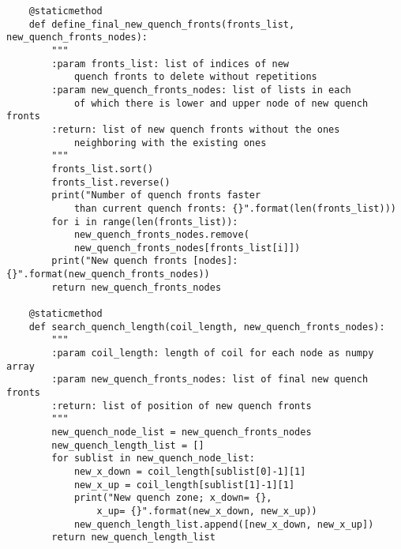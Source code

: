 \begin{verbatim}
    @staticmethod
    def define_final_new_quench_fronts(fronts_list, new_quench_fronts_nodes):
        """
        :param fronts_list: list of indices of new 
            quench fronts to delete without repetitions
        :param new_quench_fronts_nodes: list of lists in each 
            of which there is lower and upper node of new quench fronts
        :return: list of new quench fronts without the ones 
            neighboring with the existing ones
        """
        fronts_list.sort()
        fronts_list.reverse()
        print("Number of quench fronts faster 
            than current quench fronts: {}".format(len(fronts_list)))
        for i in range(len(fronts_list)):
            new_quench_fronts_nodes.remove(
            new_quench_fronts_nodes[fronts_list[i]])
        print("New quench fronts [nodes]: {}".format(new_quench_fronts_nodes))
        return new_quench_fronts_nodes

    @staticmethod
    def search_quench_length(coil_length, new_quench_fronts_nodes):
        """
        :param coil_length: length of coil for each node as numpy array
        :param new_quench_fronts_nodes: list of final new quench fronts
        :return: list of position of new quench fronts
        """
        new_quench_node_list = new_quench_fronts_nodes
        new_quench_length_list = []
        for sublist in new_quench_node_list:
            new_x_down = coil_length[sublist[0]-1][1]
            new_x_up = coil_length[sublist[1]-1][1]
            print("New quench zone; x_down= {}, 
                x_up= {}".format(new_x_down, new_x_up))
            new_quench_length_list.append([new_x_down, new_x_up])
        return new_quench_length_list

\end{verbatim}